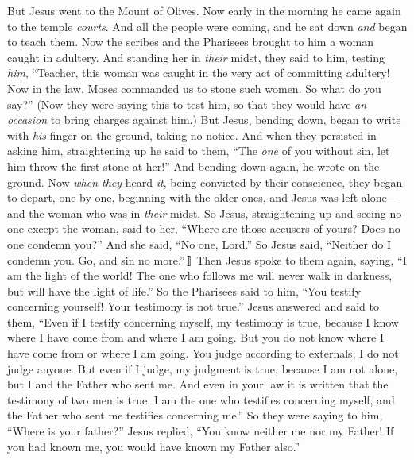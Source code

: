\begin{biblechapter} %
 But Jesus went to the Mount of Olives.
\verse Now early in the morning he came again to the temple \textit{courts}. And all the people were coming, and he sat down \textit{and} began to teach them.
\verse Now the scribes and the Pharisees brought to him a woman caught in adultery. And standing her in \textit{their} midst,
\verse they said to him, testing \textit{him}, “Teacher, this woman was caught in the very act of committing adultery!
\verse Now in the law, Moses commanded us to stone such women. So what do you say?”
\verse (Now they were saying this to test him, so that they would have \textit{an occasion} to bring charges against him.) But Jesus, bending down, began to write with \textit{his} finger on the ground, taking no notice.
\verse And when they persisted in asking him, straightening up he said to them, “The \textit{one} of you without sin, let him throw the first stone at her!”
\verse And bending down again, he wrote on the ground.
\verse Now \textit{when they} heard \textit{it}, being convicted by their conscience, they began to depart, one by one, beginning with the older ones, and Jesus was left alone—and the woman who was in \textit{their} midst.
\verse So Jesus, straightening up and seeing no one except the woman, said to her, “Where are those accusers of yours? Does no one condemn you?”
\verse And she said, “No one, Lord.” So Jesus said, “Neither do I condemn you. Go, and sin no more.”〛
 Then Jesus spoke to them again, saying, “I am the light of the world! The one who follows me will never walk in darkness, but will have the light of life.”
\verse So the Pharisees said to him, “You testify concerning yourself! Your testimony is not true.”
\verse Jesus answered and said to them, “Even if I testify concerning myself, my testimony is true, because I know where I have come from and where I am going. But you do not know where I have come from or where I am going.
\verse You judge according to externals; I do not judge anyone.
\verse But even if I judge, my judgment is true, because I am not alone, but I and the Father who sent me.
\verse And even in your law it is written that the testimony of two men is true.
\verse I am the one who testifies concerning myself, and the Father who sent me testifies concerning me.”
\verse So they were saying to him, “Where is your father?” Jesus replied, “You know neither me nor my Father! If you had known me, you would have known my Father also.”

\end{biblechapter}
